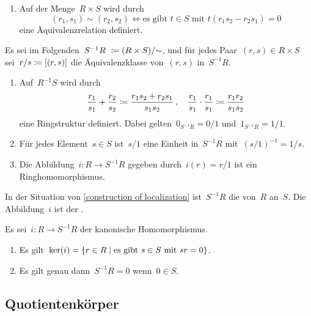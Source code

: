 \begin{proposition}
  \label{construction of localization}
  \leavevmode
  \begin{enumerate}
    \item
      Auf der Menge~$R \times S$ wird durch
      \[
        (r_1, s_1) \sim (r_2, s_2)
        \iff
        \text{es gibt~$t \in S$ mit~$t(r_1 s_2 - r_2 s_1) = 0$}
      \]
      eine Äquivalenzrelation definiert.
  \end{enumerate}
  Es sei im Folgenden~$S^{-1} R \defined (R \times S) / {\sim}$, und für jedes Paar~$(r,s) \in R \times S$ sei~$r/s \coloneqq [(r,s)]$ die Äquivalenzklasse von~$(r,s)$ in~$S^{-1} R$.
  \begin{enumerate}[resume*]
    \item
      Auf~$R^{-1} S$ wird durch
      \[
        \frac{r_1}{s_1} + \frac{r_2}{s_2}
        \coloneqq
        \frac{r_1 s_2 + r_2 s_1}{s_1 s_2} \,,
        \quad
        \frac{r_1}{s_1} \cdot \frac{r_1}{s_1}
        \coloneqq
        \frac{r_1 r_2}{s_1 s_2}
      \]
      eine Ringstruktur definiert.
      Dabei gelten~$0_{S^{-1} R} = 0/1$ und~$1_{S^{-1} R} = 1/1$.
    \item
      Für jedes Element~$s \in S$ ist~$s/1$ eine Einheit in~$S^{-1} R$ mit~$(s/1)^{-1} = 1/s$.
    \item
      Die Abbildung~$i \colon R \to S^{-1} R$ gegeben durch~$i(r) = r/1$ ist ein Ringhomomorphismus.
  \end{enumerate}
\end{proposition}

\begin{definition}
  In der Situation von \cref{construction of localization} ist~$S^{-1} R$ die  von~$R$ an~$S$.
  Die Abbildung~$i$ ist der .
\end{definition}

\begin{proposition}
  Es sei~$i \colon R \to S^{-1} R$ der kanonische Homomorphismus.
  \begin{enumerate}
    \item
      Es gilt~$\ker(i) = \{ r \in R \suchthat \text{es gibt~$s \in S$ mit~$sr = 0$} \}$.
    \item
      Es gilt genau dann~$S^{-1} R = 0$ wenn~$0 \in S$.
  \end{enumerate}
\end{proposition}



\subsection{Quotientenkörper}

